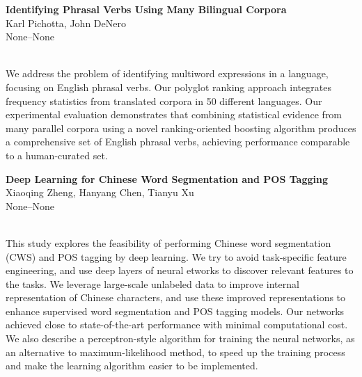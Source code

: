 \documentclass[twoside,makeidx]{book}
\renewcommand{\normalsize}{\fontsize{8}{9}\selectfont}
\renewcommand{\small}{\fontsize{7}{8}\selectfont}
\begin{document}
\par\vspace{2em}\noindent%
\begin{minipage}{\linewidth}%
\begin{center}
\textbf{\normalsize Identifying Phrasal Verbs Using Many Bilingual Corpora}\\
\normalsize  Karl Pichotta,  John DeNero\\
{\small None--None}\\
\end{center}
\end{minipage}\\[0.5em]
\nopagebreak%
\noindent%
{\small We address the problem of identifying multiword expressions in a language, focusing on English phrasal verbs. Our polyglot ranking approach integrates frequency statistics from translated corpora in 50 different languages.  Our experimental evaluation demonstrates that combining statistical evidence from many parallel corpora using a novel ranking-oriented boosting algorithm produces a comprehensive set of English phrasal verbs, achieving performance comparable to a human-curated set.}
\par\vspace{2em}\noindent%
\begin{minipage}{\linewidth}%
\begin{center}
\textbf{\normalsize Deep Learning for Chinese Word Segmentation and POS Tagging}\\
\normalsize  Xiaoqing Zheng,  Hanyang Chen,  Tianyu Xu\\
{\small None--None}\\
\end{center}
\end{minipage}\\[0.5em]
\nopagebreak%
\noindent%
{\small This study explores the feasibility of performing Chinese word segmentation (CWS) and POS tagging by deep learning. We try to avoid task-specific feature engineering, and use deep layers of neural etworks to discover relevant features to the tasks. We leverage large-scale unlabeled data to improve internal representation of Chinese characters, and use these improved representations to enhance supervised word segmentation and POS tagging models. Our networks achieved close to state-of-the-art performance with minimal computational cost. We also describe a perceptron-style algorithm for training the neural networks, as an alternative to maximum-likelihood method, to speed up the training process and make the learning algorithm easier to be implemented.}
\end{document}
